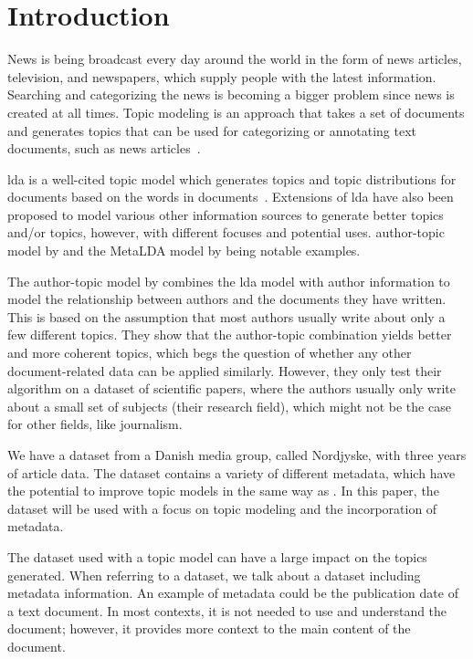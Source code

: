 \section{Introduction}\label{sec:introduction}
News is being broadcast every day around the world in the form of news articles, television, and newspapers, which supply people with the latest information.
Searching and categorizing the news is becoming a bigger problem since news is created at all times.
Topic modeling is an approach that takes a set of documents and generates topics that can be used for categorizing or annotating text documents, such as news articles~\cite{Probabilistic_Topic_Models}.

\Gls{lda} is a well-cited topic model which generates topics and topic distributions for documents based on the words in documents~\cite{blei2003latent}.
Extensions of \gls{lda} have also been proposed to model various other information sources to generate better topics and/or topics, however, with different focuses and potential uses.
author-topic model by \citet{author_topic_2012} and the MetaLDA model by \citet{MetaLDA2017} being notable examples.

The author-topic model by \citet{author_topic_2012} combines the \gls{lda} model with author information to model the relationship between authors and the documents they have written.
This is based on the assumption that most authors usually write about only a few different topics.
They show that the author-topic combination yields better and more coherent topics, which begs the question of whether any other document-related data can be applied similarly.
However, they only test their algorithm on a dataset of scientific papers, where the authors usually only write about a small set of subjects (their research field), which might not be the case for other fields, like journalism.

We have a dataset from a Danish media group, called Nordjyske, with three years of article data.
The dataset contains a variety of different metadata, which have the potential to improve topic models in the same way as \citet{author_topic_2012}. 
In this paper, the dataset will be used with a focus on topic modeling and the incorporation of metadata.

The dataset used with a topic model can have a large impact on the topics generated.
When referring to a dataset, we talk about a dataset including metadata information.
An example of metadata could be the publication date of a text document. 
In most contexts, it is not needed to use and understand the document; however, it provides more context to the main content of the document.


